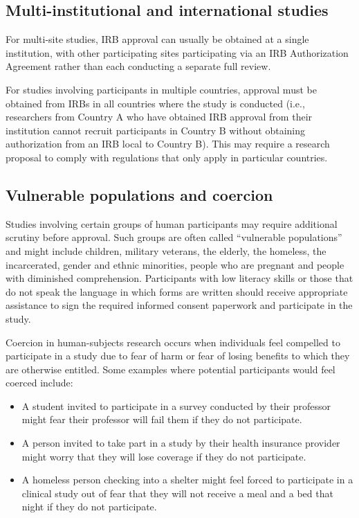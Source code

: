 \documentclass[letterpaper, 12pt]{article}
\begin{document}
\subsection*{Multi-institutional and international studies}

For multi-site studies, IRB approval can usually be obtained at a single institution, with other participating sites participating via an IRB Authorization Agreement rather than each conducting a separate full review. 

For studies involving participants in multiple countries, approval must be obtained from IRBs in all countries where the study is conducted (i.e., researchers from Country A who have obtained IRB approval from their institution cannot recruit participants in Country B without obtaining authorization from an IRB local to Country B). This may require a research proposal to comply with regulations that only apply in particular countries.

\subsection*{Vulnerable populations and coercion}

Studies involving certain groups of human participants may require additional scrutiny before approval. Such groups are often called ``vulnerable populations'' and might include children, military veterans, the elderly, the homeless, the incarcerated, gender and ethnic minorities, people who are pregnant and people with diminished comprehension. Participants with low literacy skills or those that do not speak the language in which forms are written should receive appropriate assistance to sign the required informed consent paperwork and participate in the study.

Coercion in human-subjects research occurs when individuals feel compelled to participate in a study due to fear of harm or fear of losing benefits to which they are otherwise entitled. Some examples where potential participants would feel coerced include:

\begin{itemize}
    \setlength\itemsep{-0.5em}
    \item A student invited to participate in a survey conducted by their professor might fear their professor will fail them if they do not participate.
    \item A person invited to take part in a study by their health insurance provider might worry that they will lose coverage if they do not participate.
    \item A homeless person checking into a shelter might feel forced to participate in a clinical study out of fear that they will not receive a meal and a bed that night if they do not participate.
\end{itemize}
\end{document}
